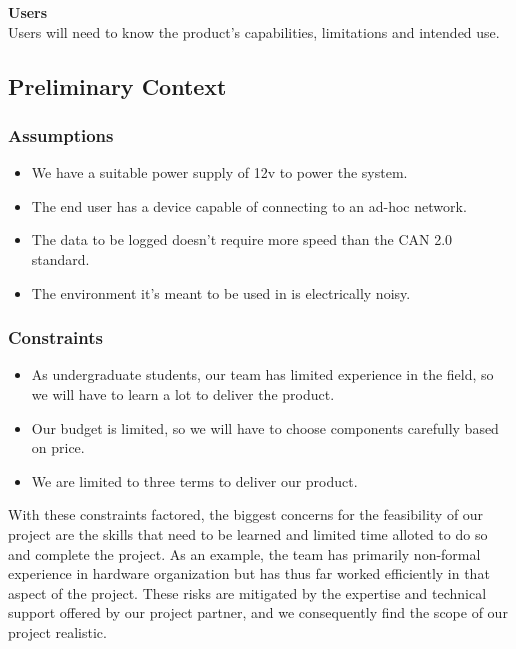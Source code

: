 \documentclass{article}
\begin{document}
\textbf{Users}\\
Users will need to know the product's capabilities, limitations and
intended use.


\subsection{Preliminary Context}
\label{preliminary-context}


\subsubsection{Assumptions}
\label{assumptions}

\begin{itemize}
\item
  We have a suitable power supply of 12v to power the system.
\item
  The end user has a device capable of connecting to an ad-hoc network.
\item
  The data to be logged doesn't require more speed than the CAN 2.0
  standard.
\item
  The environment it's meant to be used in is electrically noisy.
\end{itemize}


\subsubsection{Constraints}
\label{constraints}

\begin{itemize}
\item
  As undergraduate students, our team has limited experience in the
  field, so we will have to learn a lot to deliver the product.
\item
  Our budget is limited, so we will have to choose components carefully
  based on price.
\item
  We are limited to three terms to deliver our product.
\end{itemize}

With these constraints factored, the biggest concerns for the
feasibility of our project are the skills that need to be learned and
limited time alloted to do so and complete the project. As an example,
the team has primarily non-formal experience in hardware organization
but has thus far worked efficiently in that aspect of the project. These
risks are mitigated by the expertise and technical support offered by
our project partner, and we consequently find the scope of our project
realistic.
\end{document}

